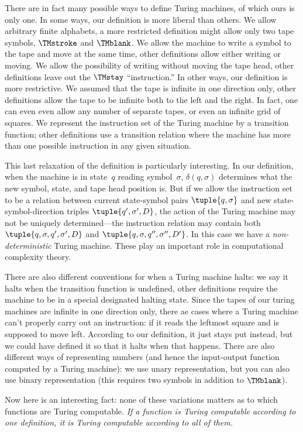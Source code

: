 \documentclass[../../../include/open-logic-section]{subfiles}
\begin{document}

There are in fact many possible ways to define Turing machines, of
which ours is only one.  In some ways, our definition is more liberal
than others. We allow arbitrary finite alphabets, a more restricted
definition might allow only two tape symbols, $\TMstroke$ and
$\TMblank$.  We allow the machine to write a symbol to the tape and
move at the same time, other definitions allow either writing or
moving.  We allow the possibility of writing without moving the tape
head, other definitions leave out the $\TMstay$ ``instruction.''  In
other ways, our definition is more restrictive. We assumed that the
tape is infinite in one direction only, other definitions allow the
tape to be infinite both to the left and the right. In fact, one can
even even allow any number of separate tapes, or even an infinite grid
of squares.  We represent the instruction set of the Turing machine by
a transition function; other definitions use a transition relation
where the machine has more than one possible instruction in any given
situation.

This last relaxation of the definition is particularly interesting.
In our definition, when the machine is in state~$q$ reading
symbol~$\sigma$, $\delta(q, \sigma)$ determines what the new symbol,
state, and tape head position is.  But if we allow the instruction set
to be a relation between current state-symbol pairs $\tuple{q,
  \sigma}$ and new state-symbol-direction triples $\tuple{q', \sigma',
  D}$, the action of the Turing machine may not be uniquely
determined---the instruction relation may contain both $\tuple{q,
  \sigma, q', \sigma', D}$ and $\tuple{q, \sigma, q'', \sigma'', D'}$.
In this case we have a \emph{non-deterministic} Turing machine.  These
play an important role in computational complexity theory.

There are also different conventions for when a Turing machine halts:
we say it halts when the transition function is undefined, other
definitions require the machine to be in a special designated halting
state. Since the tapes of our turing machines are infinite in one
direction only, there ae cases where a Turing machine can't properly
carry out an instruction: if it reads the leftmost square and is
supposed to move left. According to our definition, it just stays put
instead, but we could have defined it so that it halts when that
happens.  There are also different ways of representing numbers (and
hence the input-output function computed by a Turing machine): we use
unary representation, but you can also use binary representation (this
requires two symbols in addition to $\TMblank$).

Now here is an interesting fact: none of these variations matters as
to which functions are Turing computable. \emph{If a function is Turing
computable according to one definition, it is Turing computable
according to all of them.}  
\end{document}
